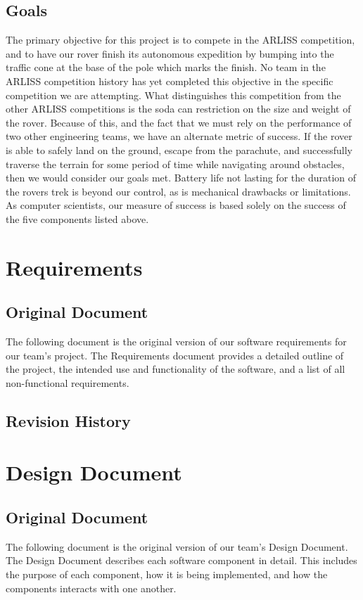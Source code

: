 \documentclass[10pt,letterpaper,onecolumn,draftclsnofoot,journal]{IEEEtran}
\begin{document}
\subsection{\textbf{Goals}}
The primary objective for this project is to compete in the ARLISS competition, and to have our rover finish its autonomous expedition by bumping into the traffic cone at the base of the pole which marks the finish. No team in the ARLISS competition history has yet completed this objective in the specific competition we are attempting. What distinguishes this competition from the other ARLISS competitions is the soda can restriction on the size and weight of the rover. Because of this, and the fact that we must rely on the performance of two other engineering teams, we have an alternate metric of success. If the rover is able to safely land on the ground, escape from the parachute, and successfully traverse the terrain for some period of time while navigating around obstacles, then we would consider our goals met. Battery life not lasting for the duration of the rovers trek is beyond our control, as is mechanical drawbacks or limitations. As computer scientists, our measure of success is based solely on the success of the five components listed above.



\section{\textbf{Requirements}}
\subsection{\textbf{Original Document}}
The following document is the original version of our software requirements for our team's project. The Requirements document provides a detailed outline of the project, the intended use and functionality of the software, and a list of all non-functional requirements.     


\subsection{\textbf{Revision History}}



\section{\textbf{Design Document}}
\subsection{\textbf{Original Document}}
The following document is the original version of our team's Design Document. The Design Document describes each software component in detail. This includes the purpose of each component, how it is being implemented, and how the components interacts with one another.    

\end{document}
